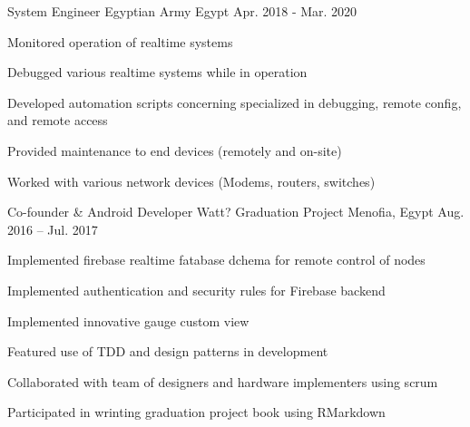 

\begin{cventries}

\cventry
{System Engineer} %
{Egyptian Army} %
{Egypt} %
{Apr. 2018 - Mar. 2020} %
{
  \begin{cvitems} %
    \item {Monitored operation of realtime systems}
    \item {Debugged various realtime systems while in operation}
    \item {Developed automation scripts concerning specialized in debugging, remote config, and remote access}
    \item {Provided maintenance to end devices (remotely and on-site)}
    \item {Worked with various network devices (Modems, routers, switches)}    
  \end{cvitems}
}

  \cventry
    {Co-founder \& Android Developer} %
    {Watt? Graduation Project} %
    {Menofia, Egypt} %
    {Aug. 2016 – Jul. 2017} %
    {
      \begin{cvitems} %
        \item {Implemented firebase realtime fatabase dchema for remote control of nodes}
        \item {Implemented authentication and security rules for Firebase backend}
        \item {Implemented innovative gauge custom view}
        \item {Featured use of TDD and design patterns in development}
        \item {Collaborated with team of designers and hardware implementers using scrum}
        \item {Participated in wrinting graduation project book using RMarkdown}        
      \end{cvitems}
    }


\end{cventries}
